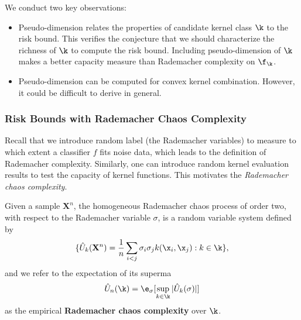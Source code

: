 \begin{remark} \label{rmk:psdim}
We conduct two key observations:
\begin{itemize}
    \item Pseudo-dimension relates the properties of candidate kernel class $\k$ to the risk
    bound. This verifies the conjecture that we should characterize the richness of
    $\k$ to compute the risk bound. Including pseudo-dimension of $\k$ makes a
    better capacity measure than Rademacher complexity on $\f_\k$.
    \item Pseudo-dimension can be computed for convex kernel combination. However, it
     could be difficult to derive in general.
\end{itemize}
\end{remark}

\subsubsection{Risk Bounds with Rademacher Chaos Complexity}

Recall that we introduce random label (the Rademacher variables) to
measure to which extent a classifier $f$ fits noise data, which leads to the
definition of Rademacher complexity. Similarly, one can introduce random
kernel evaluation results to test the capacity of kernel functions. This
motivates the {\em Rademacher chaos complexity}.

\begin{definition} \cite{colt/YingC09}
Given a sample $\mathbf X^n$, the homogeneous Rademacher chaos process of order
two, with respect to the Rademacher variable $\sigma$, is a random variable system
defined by
\[
\{ \hat{U}_k(\mathbf X^n) = \frac{1}{n} \sum_{i < j} \sigma_i\sigma_jk(\x_i, \x_j): k \in \k \},
\]
and we refer to the expectation of its superma
\[
\hat{U}_n(\k) = \e_{\sigma}[\sup_{k \in \k}|\hat{U}_k(\sigma)|]
\]
as the empirical {\bf Rademacher chaos complexity} over $\k$.
\end{definition}

